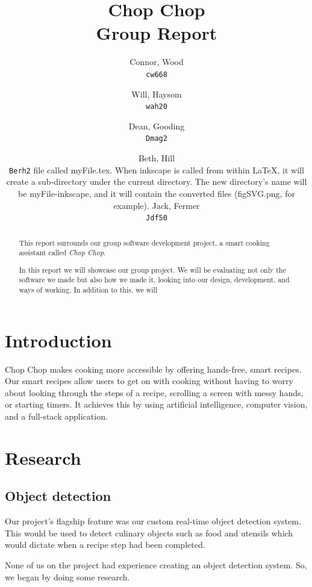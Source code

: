 \documentclass{article}
\title{%
Chop Chop \\
  \large Group Report}
\author{
  Connor, Wood\\
  \texttt{cw668}
  \and
  Will, Haysom\\
  \texttt{wah20}
  \and
  Dean, Gooding\\
  \texttt{Dmag2}
  \and
  Beth, Hill\\
  \texttt{Berh2}
  \andLaTeX file called myFile.tex. When inkscape is called from within LaTeX, it will create a sub-directory under the current directory. The new directory’s name will be myFile-inkscape, and it will contain the converted files (figSVG.png, for example).
  Jack, Fermer\\
  \texttt{Jdf50}
}
\begin{document}
\maketitle

\pagebreak

\linenumbers

\begin{abstract}
      This report surrounds our group software development project, a smart cooking assistant called \emph{Chop Chop}. 
    
      In this report we will showcase our group project. We will be evaluating not only the software we made but also how we made it, looking into our design, development, and ways of working. In addition to this, we will 
  \end{abstract}

  \pagebreak

  \tableofcontents

  \pagebreak



    \section{Introduction}
Chop Chop makes cooking more accessible by offering hands-free, smart recipes. Our smart recipes allow users to get on with cooking without having to worry about looking through the steps of a recipe, scrolling a screen with messy hands, or starting timers. It achieves this by using artificial intelligence, computer vision, and a full-stack application.

    \section{Research}
    \subsection{Object detection}
    Our project's flagship feature was our custom real-time object detection system. This would be used to detect culinary objects such as food and utensils which would dictate when a recipe step had been completed.
    
None of us on the project had experience creating an object detection system. So, we began by doing some research. 
\end{document}
